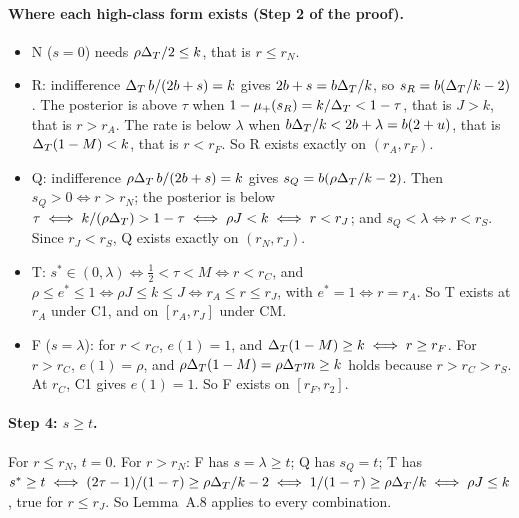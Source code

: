 \paragraph{Where each high-class form exists (Step 2 of the proof).}
\begin{itemize}[leftmargin=2em]
\item N (\(s=0\)) needs \(\rho\Delta_T/2\le k\), that is \(r\le r_N\).
\item R: indifference \(\Delta_T\,b/(2b+s)=k\) gives \(2b+s=b\Delta_T/k\), so \(s_R=b(\Delta_T/k-2)\). The posterior is above \(\tau\)
when \(1-\mu_+(s_R)=k/\Delta_T<1-\tau\), that is \(J>k\), that is \(r>r_A\). The rate is below \(\lambda\) when
\(b\Delta_T/k<2b+\lambda=b(2+u)\), that is \(\Delta_T(1-M)<k\), that is \(r<r_F\). So R exists exactly on \((r_A,r_F)\).
\item Q: indifference \(\rho\Delta_T\,b/(2b+s)=k\) gives \(s_Q=b(\rho\Delta_T/k-2)\). Then \(s_Q>0\iff r>r_N\); the posterior is
below \(\tau\iff k/(\rho\Delta_T)>1-\tau\iff\rho J<k\iff r<r_J\); and \(s_Q<\lambda\iff r<r_S\). Since \(r_J<r_S\), Q exists
exactly on \((r_N,r_J)\).
\item T: \(s^*\in(0,\lambda)\iff\tfrac12<\tau<M\iff r<r_C\), and \(\rho\le e^*\le1\iff\rho J\le k\le J\iff r_A\le r\le
r_J\), with \(e^*=1\iff r=r_A\). So T exists at \(r_A\) under C1, and on \([r_A,r_J]\) under CM.
\item F (\(s=\lambda\)): for \(r<r_C\), \(e(1)=1\), and \(\Delta_T(1-M)\ge k\iff r\ge r_F\). For \(r>r_C\), \(e(1)=\rho\), and
\(\rho\Delta_T(1-M)=\rho\Delta_T m\ge k\) holds because \(r>r_C>r_S\). At \(r_C\), C1 gives \(e(1)=1\). So F exists on
\([r_F,r_2]\).
\end{itemize}

\paragraph{Step 4: \(s\ge t\).} For \(r\le r_N\), \(t=0\). For \(r>r_N\): F has \(s=\lambda\ge t\); Q has \(s_Q=t\);
T has \(s^*\ge t\iff(2\tau-1)/(1-\tau)\ge\rho\Delta_T/k-2\iff1/(1-\tau)\ge\rho\Delta_T/k\iff\rho J\le k\), true for \(r\le r_J\).
So Lemma~A.8 applies to every combination.

